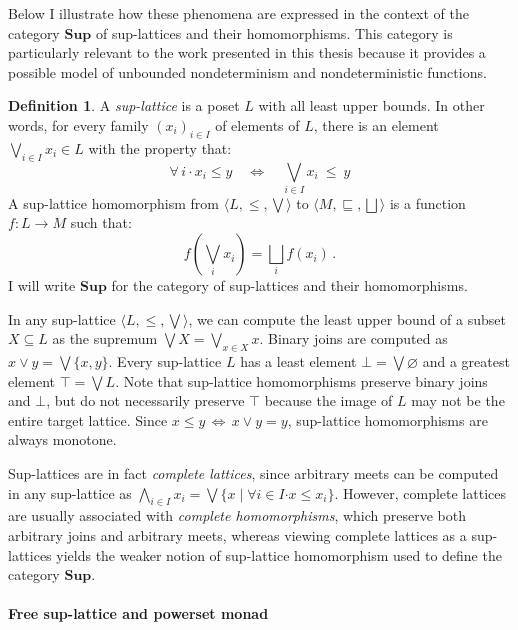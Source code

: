 \documentclass[11pt,oneside,draft]{book}
\theoremstyle{definition}
\newtheorem{definition}[theorem]{Definition}
\newcommand{\bdot}{\boldsymbol{\cdot}}
\begin{document}
Below I illustrate how these phenomena
are expressed in the context of the category $\mathbf{Sup}$
of sup-lattices and their homomorphisms.
This category is particularly relevant
to the work presented in this thesis
because it provides
a possible model of unbounded nondeterminism
and nondeterministic functions.

\begin{definition} %
A \emph{sup-lattice} is a poset $L$
with all least upper bounds.
In other words,
for every family $(x_i)_{i \in I}$
of elements of $L$,
there is an element
$\bigvee_{i \in I} x_i \in L$
with the property that:
\[
  \forall \, i \, \bdot \, x_i \le y
  \quad \Leftrightarrow \quad
  \bigvee_{i \in I} x_i \: \le \: y
\]
A sup-lattice homomorphism
from $\langle L, {\le}, {\bigvee} \rangle$
to $\langle M, {\sqsubseteq}, {\bigsqcup} \rangle$
is a function $f : L \rightarrow M$
such that:
\[
  f \left( \bigvee_i x_i \right) =
  \bigsqcup_i f(x_i)
  \,.
\]
I will write $\mathbf{Sup}$ for
the category of sup-lattices and their homomorphisms.
\end{definition}

In any sup-lattice $\langle L, {\le}, {\bigvee} \rangle$,
we can compute the least upper bound
of a subset $X \subseteq L$
as the supremum $\bigvee X = \bigvee_{x \in X} x$.
Binary joins are computed as $x \vee y = \bigvee \{ x, y \}$.
Every sup-lattice $L$ has
a least element $\bot = \bigvee \varnothing$ and
a greatest element $\top = \bigvee L$.
Note that sup-lattice homomorphisms
preserve binary joins and $\bot$,
but do not necessarily preserve $\top$
because the image of $L$ may not be the entire target lattice.
Since
$x \le y \, \Leftrightarrow \, x \vee y = y$,
sup-lattice homomorphisms are always monotone.

Sup-lattices are in fact \emph{complete lattices},
since arbitrary meets can be computed in any sup-lattice as
$
  \bigwedge_{i \in I} x_i =
  \bigvee \{ x \mid \forall i \in I \bdot x \le x_i \}
$.
However,
complete lattices are usually associated with
\emph{complete homomorphisms},
which preserve both arbitrary joins and arbitrary meets,
whereas viewing complete lattices as a sup-lattices
yields the weaker notion of sup-lattice homomorphism
used to define the category $\mathbf{Sup}$.

\paragraph{Free sup-lattice and powerset monad} %
\end{document}
